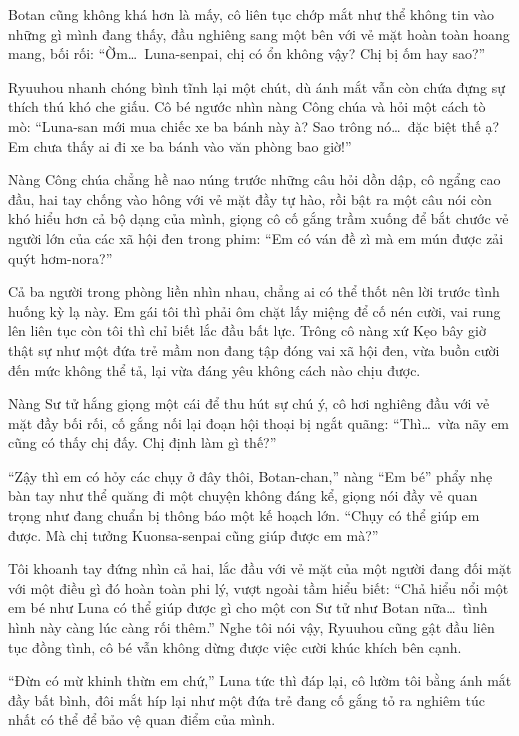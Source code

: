 \documentclass[../main.tex]{subfiles}
\begin{document}
Botan cũng không khá hơn là mấy, cô liên tục chớp mắt như thể không tin vào những gì mình đang thấy, đầu nghiêng sang một bên với vẻ mặt hoàn toàn hoang mang, bối rối: ``Ờm\dots\ Luna-senpai, chị có ổn không vậy? Chị bị ốm hay sao?''

Ryuuhou nhanh chóng bình tĩnh lại một chút, dù ánh mắt vẫn còn chứa đựng sự thích thú khó che giấu. Cô bé ngước nhìn nàng Công chúa và hỏi một cách tò mò: ``Luna-san mới mua chiếc xe ba bánh này à? Sao trông nó\dots\ đặc biệt thế ạ? Em chưa thấy ai đi xe ba bánh vào văn phòng bao giờ!''

Nàng Công chúa chẳng hề nao núng trước những câu hỏi dồn dập, cô ngẩng cao đầu, hai tay chống vào hông với vẻ mặt đầy tự hào, rồi bật ra một câu nói còn khó hiểu hơn cả bộ dạng của mình, giọng cô cố gắng trầm xuống để bắt chước vẻ người lớn của các xã hội đen trong phim: ``Em có ván đề zì mà em mún được zải quýt hơm-nora?''

Cả ba người trong phòng liền nhìn nhau, chẳng ai có thể thốt nên lời trước tình huống kỳ lạ này. Em gái tôi thì phải ôm chặt lấy miệng để cố nén cười, vai rung lên liên tục còn tôi thì chỉ biết lắc đầu bất lực. Trông cô nàng xứ Kẹo bây giờ thật sự như một đứa trẻ mầm non đang tập đóng vai xã hội đen, vừa buồn cười đến mức không thể tả, lại vừa đáng yêu không cách nào chịu được.

Nàng Sư tử hắng giọng một cái để thu hút sự chú ý, cô hơi nghiêng đầu với vẻ mặt đầy bối rối, cố gắng nối lại đoạn hội thoại bị ngắt quãng: ``Thì\dots\ vừa nãy em cũng có thấy chị đấy. Chị định làm gì thế?''

``Zậy thì em có hỏy các chụy ở đây thôi, Botan-chan,'' nàng ``Em bé'' phẩy nhẹ bàn tay như thể quăng đi một chuyện không đáng kể, giọng nói đầy vẻ quan trọng như đang chuẩn bị thông báo một kế hoạch lớn. ``Chụy có thể giúp em được. Mà chị tưởng Kuonsa-senpai cũng giúp được em mà?''

Tôi khoanh tay đứng nhìn cả hai, lắc đầu với vẻ mặt của một người đang đối mặt với một điều gì đó hoàn toàn phi lý, vượt ngoài tầm hiểu biết: ``Chả hiểu nổi một em bé như Luna có thể giúp được gì cho một con Sư tử như Botan nữa\dots\ tình hình này càng lúc càng rối thêm.'' Nghe tôi nói vậy, Ryuuhou cũng gật đầu liên tục đồng tình, cô bé vẫn không dừng được việc cười khúc khích bên cạnh.

``Đừn có mừ khinh thừn em chứ,'' Luna tức thì đáp lại, cô lườm tôi bằng ánh mắt đầy bất bình, đôi mắt híp lại như một đứa trẻ đang cố gắng tỏ ra nghiêm túc nhất có thể để bảo vệ quan điểm của mình.
\end{document}
